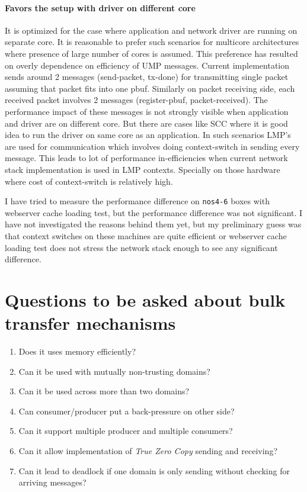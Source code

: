 \documentclass[a4paper,twoside]{report} %
\begin{document}
\paragraph{Favors the setup with driver on different core}
It is optimized for the case where application and network driver are
running on separate core.  It is reasonable to prefer such scenarios
for multicore architectures where presence of large number of cores is
assumed.  This preference has resulted on overly dependence on
efficiency of UMP messages.  Current implementation sends around 2
messages (send-packet, tx-done) for transmitting single packet
assuming that packet fits into one pbuf.  Similarly on packet
receiving side, each received packet involves 2 messages 
(register-pbuf, packet-received).  The performance impact of these
messages is not strongly visible when application and driver are on
different core.  But there are cases like SCC where it is good idea 
to run the driver on same core as an application.  In such scenarios
LMP's are used for communication which involves doing context-switch in
sending every message. This leads to lot of performance
in-efficiencies when current network stack implementation is used in
LMP contexts.  Specially on those hardware where cost of
context-switch is relatively high.


I have tried to measure the performance difference on \texttt{nos4-6}
boxes with webserver cache loading test, but the performance
difference was not significant.  I have not investigated the reasons
behind them yet, but my preliminary guess was that context switches on
these machines are quite efficient or webserver cache loading test
does not stress the network stack enough to see any significant
difference.


\section{Questions to be asked about bulk transfer mechanisms}
\begin{enumerate}
  \item Does it uses memory efficiently?
  \item Can it be used with mutually non-trusting domains?
  \item Can it be used across more than two domains?
  \item Can consumer/producer put a back-pressure on other side?
  \item Can it support multiple producer and multiple consumers?
  \item Can it allow implementation of \textit{True Zero Copy}
  sending and receiving?
  \item Can it lead to deadlock if one domain is only sending without
  checking for arriving messages?
\end{enumerate}
\end{document}
